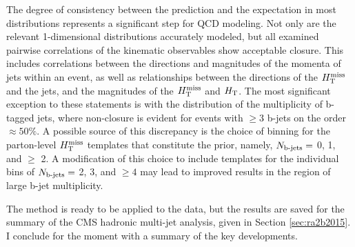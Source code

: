 \FloatBarrier
\noindent
The degree of consistency between the prediction and the expectation in most distributions represents a significant step for QCD modeling. Not only are the relevant 1-dimensional distributions accurately modeled, but all examined pairwise correlations of the kinematic observables show acceptable closure. This includes correlations between the directions and magnitudes of the momenta of jets within an event, as well as relationships between the directions of the $H_{\text{T}}^{\rm miss}$ and the jets, and the magnitudes of the $H_{\text{T}}^{\rm miss}$ and $H_{\rm T}$. The most significant exception to these statements is with the distribution of the multiplicity of b-tagged jets,  where non-closure is evident for events with $\geq 3$ b-jets on the order $\approx50\%$. A possible source of this discrepancy is the choice of binning for the parton-level $H_{\text{T}}^{\rm miss}$ templates that constitute the prior, namely, $N_{\text{b-jets}}=$ 0, 1, and $\geq$ 2.  A modification of this choice to include templates for the individual bins of $N_{\text{b-jets}}=$ 2, 3, and $\geq 4$ may lead to improved results in the region of large b-jet multiplicity. 

The method is ready to be applied to the data, but the results are saved for the summary of the CMS hadronic multi-jet analysis, given in Section \ref{sec:ra2b2015}. I conclude for the moment with a summary of the key developments.

